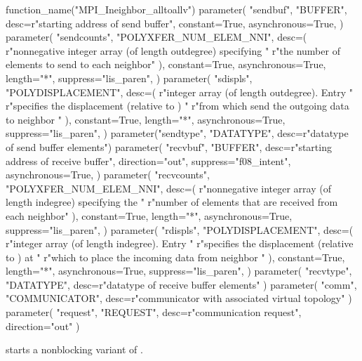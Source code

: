 \begin{mpi-binding}
    function_name("MPI_Ineighbor_alltoallv")
    parameter(
        "sendbuf",
        "BUFFER",
        desc=r"starting address of send buffer",
        constant=True,
        asynchronous=True,
    )
    parameter(
        "sendcounts",
        "POLYXFER_NUM_ELEM_NNI",
        desc=(
            r"nonnegative integer array (of length outdegree) specifying "
            r"the number of elements to send to each neighbor"
        ),
        constant=True,
        asynchronous=True,
        length="*",
        suppress="lis_paren",
    )
    parameter(
        "sdispls",
        "POLYDISPLACEMENT",
        desc=(
            r"integer array (of length outdegree). Entry  "
            r"specifies the displacement (relative to ) "
            r"from which send the outgoing data to neighbor "
        ),
        constant=True,
        length="*",
        asynchronous=True,
        suppress="lis_paren",
    )
    parameter("sendtype", "DATATYPE", desc=r"datatype of send buffer elements")
    parameter(
        "recvbuf",
        "BUFFER",
        desc=r"starting address of receive buffer",
        direction="out",
        suppress="f08_intent",
        asynchronous=True,
    )
    parameter(
        "recvcounts",
        "POLYXFER_NUM_ELEM_NNI",
        desc=(
            r"nonnegative integer array (of length indegree) specifying the "
            r"number of elements that are received from each neighbor"
        ),
        constant=True,
        length="*",
        asynchronous=True,
        suppress="lis_paren",
    )
    parameter(
        "rdispls",
        "POLYDISPLACEMENT",
        desc=(
            r"integer array (of length indegree). Entry  "
            r"specifies the displacement (relative to ) at "
            r"which to place the incoming data from neighbor "
        ),
        constant=True,
        length="*",
        asynchronous=True,
        suppress="lis_paren",
    )
    parameter(
        "recvtype", "DATATYPE", desc=r"datatype of receive buffer elements"
    )
    parameter(
        "comm", "COMMUNICATOR", desc=r"communicator with associated virtual topology"
    )
    parameter(
        "request", "REQUEST", desc=r"communication request", direction="out"
    )
\end{mpi-binding}

 starts a nonblocking variant of
.

